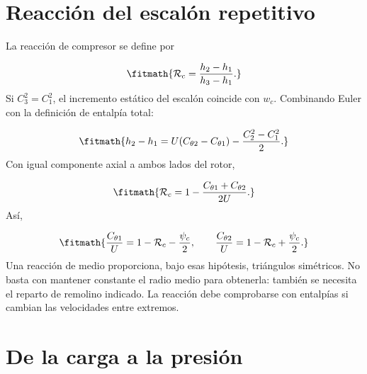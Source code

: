 \documentclass[10pt,openany]{book}
\begin{document}
\begin{minipage}{\linewidth}
\else
{}%
\fi
\fi
\endgroup
\par\nopagebreak
{}
\end{minipage}
\par\vspace{\baselineskip}

\section{Reacción del escalón repetitivo}


La reacción de compresor se define por



\[
\fitmath{\mathcal R_c=\frac{h_2-h_1}{h_3-h_1}.}
\]
Si \(C_3^2=C_1^2\), el incremento estático del escalón coincide con \(w_c\). Combinando Euler con la definición de entalpía total:

\[
\fitmath{h_2-h_1=U(C_{\theta2}-C_{\theta1})-\frac{C_2^2-C_1^2}{2}.}
\]
Con igual componente axial a ambos lados del rotor,

\[
\fitmath{\mathcal R_c=1-\frac{C_{\theta1}+C_{\theta2}}{2U}.}
\]
Así,

\[
\fitmath{\frac{C_{\theta1}}U=1-\mathcal R_c-\frac{\psi_c}{2},\qquad
\frac{C_{\theta2}}U=1-\mathcal R_c+\frac{\psi_c}{2}.}
\]
Una reacción de medio proporciona, bajo esas hipótesis, triángulos simétricos. No basta con mantener constante el radio medio para obtenerla: también se necesita el reparto de remolino indicado. La reacción debe comprobarse con entalpías si cambian las velocidades entre extremos.

\section{De la carga a la presión}
\end{document}
